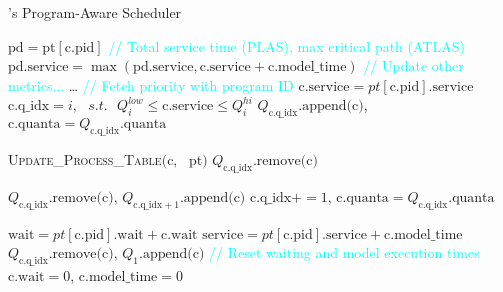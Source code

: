 \begin{algorithm}[t]
    \small
    \caption{\text{\name}'s Program-Aware Scheduler}
    \label{algorithm:agentix}
    \begin{algorithmic}[1]

        \State $\text{pd} = \text{pt}[\text{c.pid}]$ \label{alg:line1}
        \State \textcolor{cyan}{// Total service time (PLAS), max critical path (ATLAS)} \label{alg:line2}
        \State $\text{pd}\text{.service} = \max(\text{pd}\text{.service}, \text{c.service} + \text{c.model\_time})$ \label{alg:line3}
        \State \textcolor{cyan}{// Update other metrics...} \label{alg:line4}
        \State \ldots \label{alg:line5}
    \EndProcedure \label{alg:line6}
        \label{alg:line9}
            \State \textcolor{cyan}{// Fetch priority with program ID} \label{alg:line10}
            \State $\text{c.service} = pt[\text{c.pid}]\text{.service}$ \label{alg:line11}
            \State $\text{c.q\_idx} = i, \text{ } s.t. \text{ } Q^{low}_{i} \leq \text{c.service} \leq Q^{hi}_{i}$ \label{alg:line12}
            \State $Q_{\text{c.q\_idx}}\text{.append(c)}$, $\text{c.quanta} = Q_{\text{c.q\_idx}}\text{.quanta}$ \label{alg:line13}
      \EndFor \label{alg:line14}

       \label{alg:line16}
          \label{alg:line17}
            \State \textsc{Update\_Process\_Table}$(\text{c}, \text{ }$pt$)$ \label{alg:line18}
            \State $Q_{\text{c.q\_idx}}\text{.remove(c)}$ \label{alg:line19}
        \EndIf \label{alg:line20}

          \label{alg:line21}
            \State $Q_{\text{c.q\_idx}}\text{.remove(c)}$, $Q_{\text{c.q\_idx}+1}\text{.append(c)}$ \label{alg:line22}
            \State $\text{c.q\_idx} += 1$, $\text{c.quanta} = Q_{\text{c.q\_idx}}\text{.quanta}$ \label{alg:line23}
        \EndIf \label{alg:line24}

        \State $\text{wait} = pt[\text{c.pid}]\text{.wait} + \text{c.wait}$ \label{alg:line25}
        \State $\text{service} = pt[\text{c.pid}]\text{.service} + \text{c.model\_time}$ \label{alg:line26}
          \label{alg:line27}
            \State $Q_{\text{c.q\_idx}}\text{.remove(c)}$, $Q_{1}\text{.append(c)}$ \label{alg:line28}
            \State \textcolor{cyan}{// Reset waiting and model execution times} \label{alg:line29}
            \State $\text{c.wait}=0$, $\text{c.model\_time}=0$ \label{alg:unknown}
        \EndIf \label{alg:line31}
      \EndFor \label{alg:line32}


\end{algorithmic}
\end{algorithm}
